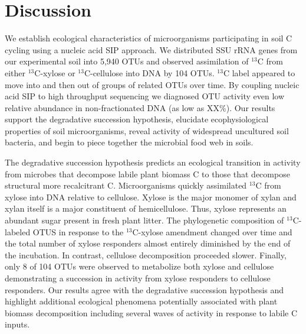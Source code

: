 \section{Discussion} 
We establish ecological characteristics of microorganisms participating in soil
C cycling using a nucleic acid SIP approach. We distributed SSU rRNA genes from
our experimental soil into 5,940 OTUs and observed assimilation of $^{13}$C
from either $^{13}$C-xylose or $^{13}$C-cellulose into DNA by 104 OTUs.
$^{13}$C label appeared to move into and then out of groups of related OTUs
over time. By coupling nucleic acid SIP to high throughput sequencing we
diagnosed OTU activity even low relative abundance in non-fractionated DNA (as
low as XX\%). Our results support the degradative succession hypothesis,
elucidate ecophysiological properties of soil microorganisms, reveal activity
of widespread uncultured soil bacteria, and begin to piece together the 
microbial food web in soils. 

The degradative succession hypothesis predicts an ecological transition in
activity from microbes that decompose labile plant biomass C to those that
decompose structural more recalcitrant C. Microorganisms quickly assimilated
$^{13}$C from xylose into DNA relative to cellulose. Xylose is the major
monomer of xylan and xylan itself is a major constituent of hemicellulose.
Thus, xylose represents an abundant sugar present in fresh plant litter. The
phylogenetic composition of $^{13}$C-labeled OTUS in response to the
$^{13}$C-xylose amendment changed over time and the total number of xylose
responders almost entirely diminished by the end of the incubation. In
contrast, cellulose decomposition proceeded slower. Finally, only 8 of 104 OTUs
were observed to metabolize both xylose and cellulose demonstrating
a succession in activity from xylose responders to cellulose responders. Our
results agree with the degradative succession hypothesis and highlight
additional ecological phenomena potentially associated with plant biomass
decomposition including several waves of activity in response to labile
C inputs.  


